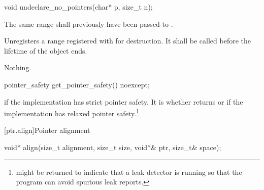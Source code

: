 %
\begin{itemdecl}
void undeclare_no_pointers(char* p, size_t n);
\end{itemdecl}

\begin{itemdescr}
\pnum
\requires The same range shall previously have been passed to
.

\pnum
\effects Unregisters a range registered with  for
destruction. It shall be called before the lifetime of the object ends.

\pnum
\throws Nothing.
\end{itemdescr}

%
\begin{itemdecl}
pointer_safety get_pointer_safety() noexcept;
\end{itemdecl}

\begin{itemdescr}
\pnum
\returns {} if the implementation has strict pointer
safety. It is
whether
 returns  or
 if the implementation has relaxed pointer
safety.\footnote{ might be returned to indicate
that a leak detector is running so that the program can avoid spurious leak
reports.}
\end{itemdescr}


[ptr.align]{Pointer alignment}

%
\begin{itemdecl}
void* align(size_t alignment, size_t size, void*& ptr, size_t& space);
\end{itemdecl}

